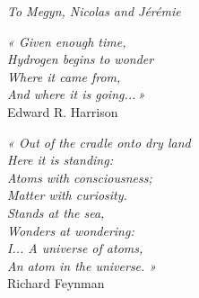 


\emptypage

\thispagestyle{empty}

\vspace*{-1.5cm}

\hspace*{0.34\textwidth} {\LARGE \emph{To Megyn, Nicolas and Jérémie}}\\

\vspace*{6.5cm}
\hspace*{0.55\textwidth}
\begin{minipage}{0.40\textwidth}
\emph{« Given enough time,\\
\hspace*{0.3cm}Hydrogen begins to wonder\\
\hspace*{0.3cm}Where it came from,\\ 
\hspace*{0.3cm}And where it is going...\,»}\\
\vspace*{0.4cm}
\hspace*{1cm}Edward R. Harrison\\
\end{minipage}

\vspace*{2.0cm}

\hspace*{0.55\textwidth}
\begin{minipage}{0.40\textwidth}
\emph{« Out of the cradle onto dry land\\
\hspace*{0.3cm}Here it is standing:\\
\hspace*{0.3cm}Atoms with consciousness;\\
\hspace*{0.3cm}Matter with curiosity.\\
\newline
\hspace*{0.3cm}Stands at the sea,\\
\hspace*{0.3cm}Wonders at wondering:\\
\hspace*{0.3cm}I... A universe of atoms,\\
\hspace*{0.3cm}An atom in the universe. »}\\
\vspace*{0.4cm}
\hspace*{2cm}Richard Feynman
\end{minipage}

